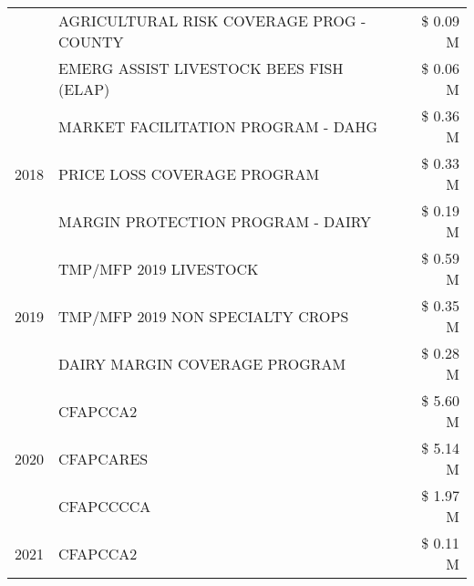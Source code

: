 \begin{tabular}{llr}
 & AGRICULTURAL RISK COVERAGE PROG - COUNTY & \$ 0.09 M \\
 & EMERG ASSIST LIVESTOCK BEES FISH (ELAP) & \$ 0.06 M \\
\cline{1-3}
\multirow[t]{3}{*}{2018} & MARKET FACILITATION PROGRAM - DAHG & \$ 0.36 M \\
 & PRICE LOSS COVERAGE PROGRAM & \$ 0.33 M \\
 & MARGIN PROTECTION PROGRAM - DAIRY & \$ 0.19 M \\
\cline{1-3}
\multirow[t]{3}{*}{2019} & TMP/MFP 2019 LIVESTOCK & \$ 0.59 M \\
 & TMP/MFP 2019 NON SPECIALTY CROPS & \$ 0.35 M \\
 & DAIRY MARGIN COVERAGE PROGRAM & \$ 0.28 M \\
\cline{1-3}
\multirow[t]{3}{*}{2020} & CFAPCCA2 & \$ 5.60 M \\
 & CFAPCARES & \$ 5.14 M \\
 & CFAPCCCCA & \$ 1.97 M \\
\cline{1-3}
2021 & CFAPCCA2 & \$ 0.11 M \\
\cline{1-3}
\bottomrule
\end{tabular}

